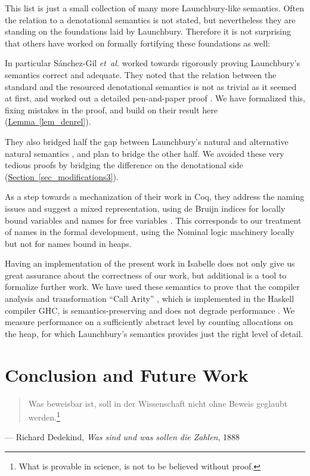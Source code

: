 \documentclass{jfp1}
\newcommand{\myref}[2]{\hyperref[#2]{#1~\ref*{#2}}}
\theoremstyle{nonumberbreak}
\begin{document}
\smallskip

This list is just a small collection of many more Launchbury-like semantics. Often the relation to a denotational semantics is not stated, but nevertheless they are standing on the foundations laid by Launchbury. Therefore it is not surprising that others have worked on formally fortifying these foundations as well:

In particular S{\'a}nchez-Gil {\em et~al.} worked towards rigorously proving Launchbury's semantics correct and adequate. They noted that the relation between the standard and the resourced denotational semantics is not as trivial as it seemed at first, and worked out a detailed pen-and-paper proof . We have formalized this, fixing mistakes in the proof, and build on their result here (\myref{Lemma}{lem_denrel}).

They also bridged half the gap between Launchbury's natural and alternative natural semantics \cite{indirections}, and plan to bridge the other half. We avoided these very tedious proofs by bridging the difference on the denotational side (\myref{Section}{sec_modifications3}).

As a step towards a mechanization of their work in Coq, they address the naming issues and suggest a mixed representation, using de Bruijn indices for locally bound variables and names for free variables . This corresponds to our treatment of names in the formal development, using the Nominal logic machinery \cite{nominal} locally but not for names bound in heaps.

\smallskip

Having an implementation of the present work in Isabelle does not only give us great assurance about the correctness of our work, but additional is a tool to formalize further work. We have used these semantics to prove that the compiler analysis and transformation ``Call Arity'' \cite{tfp}, which is implemented in the Haskell compiler GHC, is semantics-preserving and does not degrade performance \cite{arity-afp}. We measure performance on a sufficiently abstract level by counting allocations on the heap, for which Launchbury’s semantics provides just the right level of detail.


\section{Conclusion and Future Work}

\begin{quote}
Was beweisbar ist, soll in der Wissenschaft nicht ohne Beweis geglaubt werden.\footnote{
What is provable in science, is not to be believed without proof.}
\end{quote}
\begin{qtsource}
--- Richard Dedekind, \textit{Was sind und was sollen die Zahlen}, 1888
\end{qtsource}
\smallskip
\end{document}
